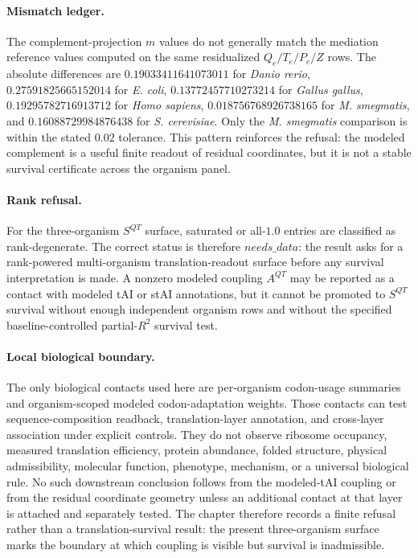 \paragraph{Mismatch ledger.}
The complement-projection $m$ values do not generally match the mediation reference values computed on the same residualized $Q_e/T_e/P_e/Z$ rows.  The absolute differences are $0.19033411641073011$ for \emph{Danio rerio}, $0.27591825665152014$ for \emph{E. coli}, $0.13772457710273214$ for \emph{Gallus gallus}, $0.19295782716913712$ for \emph{Homo sapiens}, $0.018756768926738165$ for \emph{M. smegmatis}, and $0.16088729984876438$ for \emph{S. cerevisiae}.  Only the \emph{M. smegmatis} comparison is within the stated $0.02$ tolerance.  This pattern reinforces the refusal: the modeled complement is a useful finite readout of residual coordinates, but it is not a stable survival certificate across the organism panel.

\paragraph{Rank refusal.}
For the three-organism $S^{QT}$ surface, saturated or all-$1.0$ entries are classified as rank-degenerate.  The correct status is therefore $needs\_data$: the result asks for a rank-powered multi-organism translation-readout surface before any survival interpretation is made.  A nonzero modeled coupling $A^{QT}$ may be reported as a contact with modeled tAI or stAI annotations, but it cannot be promoted to $S^{QT}$ survival without enough independent organism rows and without the specified baseline-controlled partial-$R^2$ survival test.

\paragraph{Local biological boundary.}
The only biological contacts used here are per-organism codon-usage summaries and organism-scoped modeled codon-adaptation weights.  Those contacts can test sequence-composition readback, translation-layer annotation, and cross-layer association under explicit controls.  They do not observe ribosome occupancy, measured translation efficiency, protein abundance, folded structure, physical admissibility, molecular function, phenotype, mechanism, or a universal biological rule.  No such downstream conclusion follows from the modeled-tAI coupling or from the residual coordinate geometry unless an additional contact at that layer is attached and separately tested.  The chapter therefore records a finite refusal rather than a translation-survival result: the present three-organism surface marks the boundary at which coupling is visible but survival is inadmissible.
